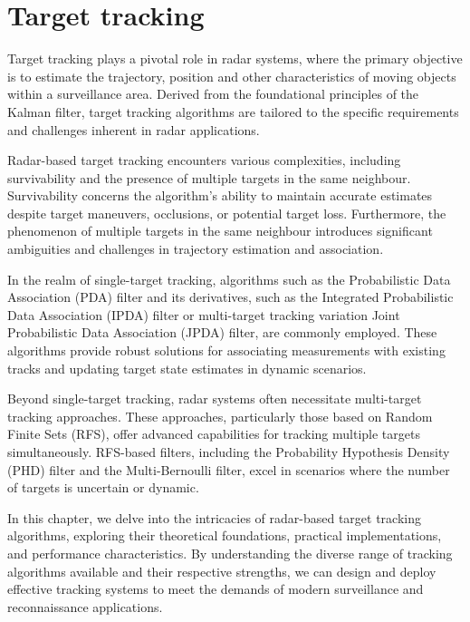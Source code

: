 
\chapter{Target tracking}
Target tracking plays a pivotal role in radar systems, where the primary objective is to estimate the trajectory,
position and other
characteristics of moving objects within a surveillance area. Derived from the foundational principles of the Kalman filter, target tracking algorithms are tailored to the specific requirements and challenges inherent in radar applications.

Radar-based target tracking encounters various complexities, including survivability and the presence of
multiple targets in the same neighbour. Survivability concerns the algorithm's ability to maintain
accurate estimates despite target maneuvers, occlusions, or potential target loss. Furthermore, the phenomenon of
multiple targets in the same neighbour introduces significant ambiguities and challenges in trajectory estimation and
association.

In the realm of single-target tracking, algorithms such as the Probabilistic Data Association (PDA) filter and its
derivatives, such as the Integrated
Probabilistic Data Association (IPDA) filter or multi-target tracking variation Joint Probabilistic Data Association (JPDA)
filter, are commonly
employed. These algorithms provide robust solutions for associating measurements with existing tracks and updating target state estimates in dynamic scenarios.

Beyond single-target tracking, radar systems often necessitate multi-target tracking approaches. These approaches,
particularly those based on Random Finite Sets (RFS), offer advanced capabilities for tracking multiple targets simultaneously. RFS-based filters, including the Probability Hypothesis Density (PHD) filter and the Multi-Bernoulli filter, excel in scenarios where the number of targets is uncertain or dynamic.

In this chapter, we delve into the intricacies of radar-based target tracking algorithms, exploring their theoretical foundations, practical implementations, and performance characteristics. By understanding the diverse range of tracking algorithms available and their respective strengths, we can design and deploy effective tracking systems to meet the demands of modern surveillance and reconnaissance applications.

